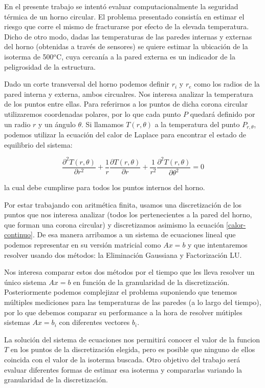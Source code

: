 En el presente trabajo se intentó evaluar computacionalmente la seguridad térmica de un horno circular. El problema presentado consistía en estimar el riesgo que corre el mismo de fracturarse por efecto de la elevada temperatura. Dicho de otro modo, dadas las temperaturas de las paredes internas y externas del horno (obtenidas a través de sensores) se quiere estimar la ubicación de la isoterma de 500$^{o}$C, cuya cercanía a la pared externa es un indicador de la peligrosidad de la estructura.

Dado un corte transversal del horno podemos definir $r_i$ y $r_e$ como los radios de la pared interna y externa, ambos circualres. Nos interesa analizar la temperatura de los puntos entre ellas. Para referirnos a los puntos de dicha corona circular utilizaremos coordenadas polares, por lo que cada punto $P$ quedará definido por un radio $r$ y un ángulo $\theta$. Si llamamos $T(r,\theta)$ a la temperatura del punto $P_{r, \theta}$, podemos utilizar la ecuación del calor de Laplace para encontrar el estado de equilibrio del sistema:

\begin{equation}\label{calor-continuo}
\frac{\partial^2T(r,\theta)}{\partial r^2}+\frac{1}{r}\frac{\partial T(r,\theta)}{\partial r}+\frac{1}{r^2}\frac{\partial^2T(r,\theta)}{\partial \theta^2} = 0 
\end{equation}

la cual debe cumplirse para todos los puntos internos del horno.

Por estar trabajando con aritmética finita, usamos una discretización de los puntos que nos interesa analizar (todos los pertenecientes a la pared del horno, que forman una corona circular) y discretizamos asimismo la ecuación \ref{calor-continuo}. De esa manera arribamos a un sistema de ecuaciones lineal que podemos representar en su versión matricial como $Ax=b$ y que intentaremos resolver usando dos métodos: la Eliminación Gaussiana y Factorización LU.

Nos interesa comparar estos dos métodos por el tiempo que les lleva resolver un único sistema $Ax=b$ en función de la granularidad de la discretización. Posteriormente podemos complejizar el problema suponiendo que tenemos múltiples mediciones para las temperaturas de las paredes (a lo largo del tiempo), por lo que debemos comparar su performance a la hora de resolver mútiples sistemas $Ax=b_i$ con diferentes vectores $b_i$.

La solución del sistema de ecuaciones nos permitirá conocer el valor de la funcion $T$ en los puntos de la discretización elegida, pero es posible que ninguno de ellos coincida con el valor de la isoterma buscada. Otro objetivo del trabajo será evaluar diferentes formas de estimar esa isoterma y compararlas variando la granularidad de la discretización.

